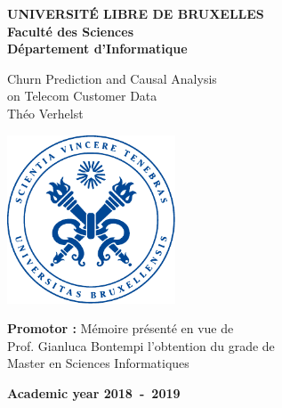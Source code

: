\clearpage
\thispagestyle{empty}

{\centering
\textbf{
    UNIVERSIT\'E LIBRE DE BRUXELLES\\
    Faculté des Sciences\\
    Département d'Informatique
}

\vfill{}

{\Huge Churn Prediction and Causal Analysis \\ on Telecom Customer Data\\}
\vspace{0.5cm}
{\LARGE Théo Verhelst}

\vfill{}

\includegraphics[width=5cm]{figures/seal.pdf}

\vfill{}

\begin{flushleft}
    {\large
    \textbf{Promotor :}     \hfill{} Mémoire présenté en vue de\\
    Prof. Gianluca Bontempi \hfill{} l’obtention du grade de \\
                            \hfill{} Master en Sciences Informatiques
    }
\end{flushleft}

\enlargethispage{1.5cm}
\vfill{}

\textbf{Academic year 2018~-~2019}\par
}

\cleartorecto
\thispagestyle{plain}

